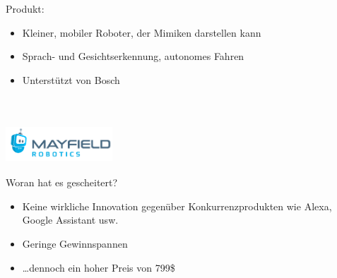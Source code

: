 \documentclass[handout]{beamer}
\begin{document}
\begin{frame}
    Produkt: \\
    \begin{itemize}
        \item<1-> Kleiner, mobiler Roboter, der Mimiken darstellen kann
        \item<2-> Sprach- und Gesichtserkennung, autonomes Fahren
        \item<3-> Unterstützt von Bosch
    \end{itemize} ~\\
\end{frame}

\begin{frame}
    \frametitle{\includegraphics[width=0.3\textwidth]{mayfield.png}}
    Woran hat es gescheitert? \\
    \begin{itemize}
        \item<1-> Keine wirkliche Innovation gegenüber Konkurrenzprodukten wie Alexa, Google Assistant usw.
        \item<2-> Geringe Gewinnspannen
        \item<3-> \dots dennoch ein hoher Preis von 799\$
    \end{itemize} ~\\
\end{frame}
\end{document}
